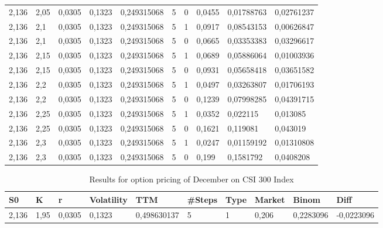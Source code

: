 \documentclass[11pt, titlepage]{article}
\begin{document}
{\begin{table}[H]
\begin{tabular}{@{}llllllllll@{}}
2,136 & 2,05 & 0,0305 & 0,1323 & 0,249315068 & 5 & 0 & 0,0455 & {\color[HTML]{3531FF} 0,01788763} & {\color[HTML]{F8A102} 0,02761237} \\
2,136 & 2,1 & 0,0305 & 0,1323 & 0,249315068 & 5 & 1 & 0,0917 & {\color[HTML]{3531FF} 0,08543153} & {\color[HTML]{F8A102} 0,00626847} \\
2,136 & 2,1 & 0,0305 & 0,1323 & 0,249315068 & 5 & 0 & 0,0665 & {\color[HTML]{3531FF} 0,03353383} & {\color[HTML]{F8A102} 0,03296617} \\
2,136 & 2,15 & 0,0305 & 0,1323 & 0,249315068 & 5 & 1 & 0,0689 & {\color[HTML]{3531FF} 0,05886064} & {\color[HTML]{F8A102} 0,01003936} \\
2,136 & 2,15 & 0,0305 & 0,1323 & 0,249315068 & 5 & 0 & 0,0931 & {\color[HTML]{3531FF} 0,05658418} & {\color[HTML]{F8A102} 0,03651582} \\
2,136 & 2,2 & 0,0305 & 0,1323 & 0,249315068 & 5 & 1 & 0,0497 & {\color[HTML]{3531FF} 0,03263807} & {\color[HTML]{F8A102} 0,01706193} \\
2,136 & 2,2 & 0,0305 & 0,1323 & 0,249315068 & 5 & 0 & 0,1239 & {\color[HTML]{3531FF} 0,07998285} & {\color[HTML]{F8A102} 0,04391715} \\
2,136 & 2,25 & 0,0305 & 0,1323 & 0,249315068 & 5 & 1 & 0,0352 & {\color[HTML]{3531FF} 0,022115} & {\color[HTML]{F8A102} 0,013085} \\
2,136 & 2,25 & 0,0305 & 0,1323 & 0,249315068 & 5 & 0 & 0,1621 & {\color[HTML]{3531FF} 0,119081} & {\color[HTML]{F8A102} 0,043019} \\
2,136 & 2,3 & 0,0305 & 0,1323 & 0,249315068 & 5 & 1 & 0,0247 & {\color[HTML]{3531FF} 0,01159192} & {\color[HTML]{F8A102} 0,01310808} \\
2,136 & 2,3 & 0,0305 & 0,1323 & 0,249315068 & 5 & 0 & 0,199 & {\color[HTML]{3531FF} 0,1581792} & {\color[HTML]{F8A102} 0,0408208} \\ \bottomrule
\end{tabular}
\end{table}
\newpage
{
\begin{table}[ht]
\centering
\caption{Results for option pricing of December on CSI 300 Index}
\label{Option results December}
\begin{tabular}{@{}llllllllll@{}}
\toprule
\textbf{S0} & \textbf{K} & \textbf{r} & \textbf{Volatility} & \textbf{TTM} & \textbf{\#Steps} & \textbf{Type} & \textbf{Market} & \textbf{Binom} & \textbf{Diff} \\ \midrule
2,136 & 1,95 & 0,0305 & 0,1323 & 0,498630137 & 5 & 1 & 0,206 & {\color[HTML]{3531FF} 0,2283096} & {\color[HTML]{F8A102} -0,0223096} \\

\end{tabular}
\end{table}}}
\end{document}
